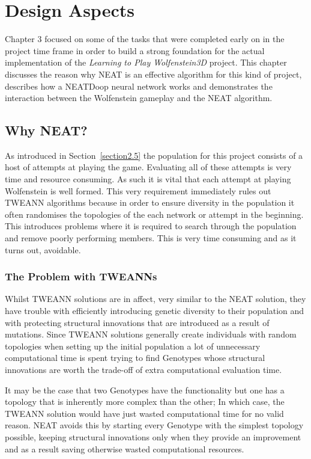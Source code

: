 \documentclass[]{Learning-to-Play-Wolfenstein-thesis}
\begin{document}
\chapter{Design Aspects}%
Chapter 3 focused on some of the tasks that were completed early on in the project time frame in order to build a strong foundation for the actual implementation of the \textit{Learning to Play Wolfenstein3D} project. This chapter discusses the reason why NEAT is an effective algorithm for this kind of project, describes how a NEATDoop neural network works and demonstrates the interaction between the Wolfenstein gameplay and the NEAT algorithm.

\section{Why NEAT?}
As introduced in Section~\ref{section2.5} the population for this project consists of a host of attempts at playing the game. Evaluating all of these attempts is very time and resource consuming. As such it is vital that each attempt at playing Wolfenstein is well formed. This very requirement immediately rules out TWEANN algorithms because in order to ensure diversity in the population it often randomises the topologies of the each network or attempt in the beginning. This introduces problems where it is required to search through the population and remove poorly performing members. This is very time consuming and as it turns out, avoidable.

\subsection{The Problem with TWEANNs}
Whilst TWEANN solutions are in affect, very similar to the NEAT solution, they have trouble with efficiently introducing genetic diversity to their population and with protecting structural innovations that are introduced as a result of mutations. Since TWEANN solutions generally create individuals with random topologies when setting up the initial population a lot of unnecessary computational time is spent trying to find Genotypes whose structural innovations are worth the trade-off of extra computational evaluation time. 

It may be the case that two Genotypes have the functionality but one has a topology that is inherently more complex than the other; In which case, the TWEANN solution would have just wasted computational time for no valid reason. NEAT avoids this by starting every Genotype with the simplest topology possible, keeping structural innovations only when they provide an improvement and as a result saving otherwise wasted computational resources.
\end{document}

